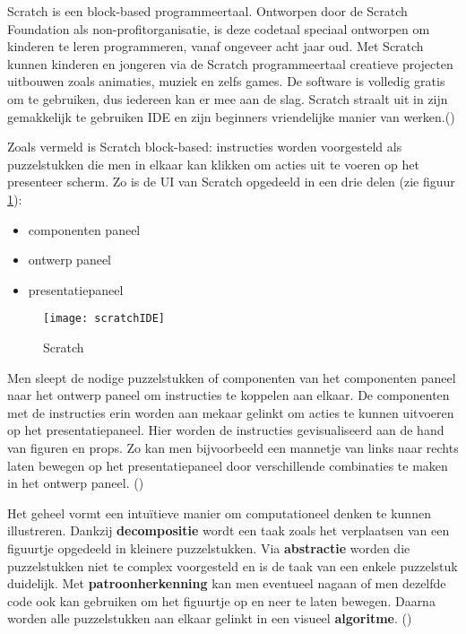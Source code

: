 Scratch is een block-based programmeertaal. Ontworpen door de Scratch Foundation als non-profitorganisatie, is deze codetaal speciaal ontworpen om kinderen te leren programmeren, vanaf ongeveer acht jaar oud. Met Scratch kunnen kinderen en jongeren via de Scratch programmeertaal creatieve projecten uitbouwen zoals animaties, muziek en zelfs games. De software is volledig gratis om te gebruiken, dus iedereen kan er mee aan de slag. Scratch straalt uit in zijn gemakkelijk te gebruiken IDE en zijn beginners vriendelijke manier van werken.(\cite{Weintrop2019,Maloney2010})

Zoals vermeld is Scratch block-based: instructies worden voorgesteld als puzzelstukken die men in elkaar kan klikken om acties uit te voeren op het presenteer scherm. Zo is de UI van Scratch opgedeeld in een drie delen (zie figuur \ref{fig:scratch2}):
\begin{itemize}
    \item componenten paneel
    \item ontwerp paneel
    \item presentatiepaneel
\end{itemize}

\begin{figure}
    \texttt{[image: scratchIDE]}
    \caption{Scratch}
    \label{fig:scratch2}
\end{figure}

Men sleept de nodige puzzelstukken of componenten van het componenten paneel naar het ontwerp paneel om instructies te koppelen aan elkaar. De componenten met de instructies erin worden aan mekaar gelinkt om acties te kunnen uitvoeren op het presentatiepaneel. Hier worden de instructies gevisualiseerd aan de hand van figuren en props. Zo kan men bijvoorbeeld een mannetje van links naar rechts laten bewegen op het presentatiepaneel door verschillende combinaties te maken in het ontwerp paneel. (\cite{Maloney2010})

Het geheel vormt een intuïtieve manier om computationeel denken te kunnen illustreren. Dankzij \textbf{decompositie} wordt een taak zoals het verplaatsen van een figuurtje opgedeeld in kleinere puzzelstukken. Via \textbf{abstractie} worden die puzzelstukken niet te complex voorgesteld en is de taak van een enkele puzzelstuk duidelijk. Met \textbf{patroonherkenning} kan men eventueel nagaan of men dezelfde code ook kan gebruiken om het figuurtje op en neer te laten bewegen. Daarna worden alle puzzelstukken aan elkaar gelinkt in een visueel \textbf{algoritme}. (\cite{Maloney2010, Weintrop2019})

